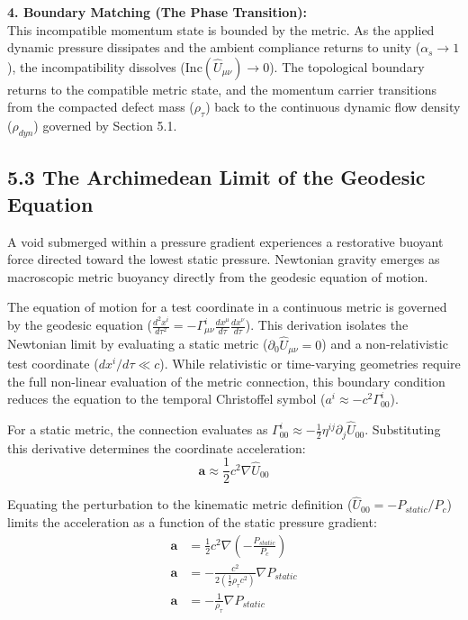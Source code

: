 \textbf{4. Boundary Matching (The Phase Transition):} \\
This incompatible momentum state is bounded by the metric. As the applied dynamic pressure dissipates and the ambient compliance returns to unity ($\alpha_s \to 1$), the incompatibility dissolves ($\text{Inc}(\hat{U}_{\mu\nu}) \to 0$). The topological boundary returns to the compatible metric state, and the momentum carrier transitions from the compacted defect mass ($\rho_\tau$) back to the continuous dynamic flow density ($\rho_{dyn}$) governed by Section 5.1.



\subsection*{5.3 The Archimedean Limit of the Geodesic Equation} 
A void submerged within a pressure gradient experiences a restorative buoyant force directed toward the lowest static pressure. Newtonian gravity emerges as macroscopic metric buoyancy directly from the geodesic equation of motion.

The equation of motion for a test coordinate in a continuous metric is governed by the geodesic equation ($\frac{d^2 x^i}{d\tau^2} = - \Gamma^i_{\mu\nu} \frac{dx^\mu}{d\tau} \frac{dx^\nu}{d\tau}$). This derivation isolates the Newtonian limit by evaluating a static metric ($\partial_0 \hat{U}_{\mu\nu} = 0$) and a non-relativistic test coordinate ($dx^i/d\tau \ll c$). While relativistic or time-varying geometries require the full non-linear evaluation of the metric connection, this boundary condition reduces the equation to the temporal Christoffel symbol ($a^i \approx -c^2 \Gamma^i_{00}$). 

For a static metric, the connection evaluates as $\Gamma^i_{00} \approx -\frac{1}{2}\eta^{ij}\partial_j \hat{U}_{00}$. Substituting this derivative determines the coordinate acceleration:
\begin{equation}
    \mathbf{a} \approx \frac{1}{2} c^2 \nabla \hat{U}_{00}
\end{equation}

Equating the perturbation to the kinematic metric definition ($\hat{U}_{00} = - P_{static}/P_c$) limits the acceleration as a function of the static pressure gradient: 
\begin{align}
    \mathbf{a} &= \frac{1}{2} c^2 \nabla \left( - \frac{P_{static}}{P_c} \right) \nonumber \\
    \mathbf{a} &= - \frac{c^2}{2 \left( \frac{1}{2}\rho_\tau c^2 \right)} \nabla P_{static} \nonumber \\
    \mathbf{a} &= - \frac{1}{\rho_\tau} \nabla P_{static} \label{eq:tensor_buoyancy_acceleration}
\end{align}

